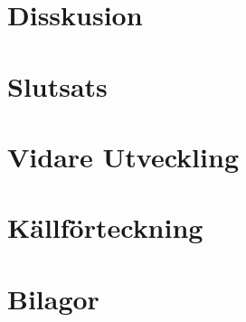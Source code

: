 \documentclass{article}
\begin{document}
	\newpage
	\section{Disskusion}

	\newpage
	\section{Slutsats}

	\newpage
	\section{Vidare Utveckling}
	
	\newpage
	\section{Källförteckning}

	\newpage
	\section{Bilagor}
\end{document}
